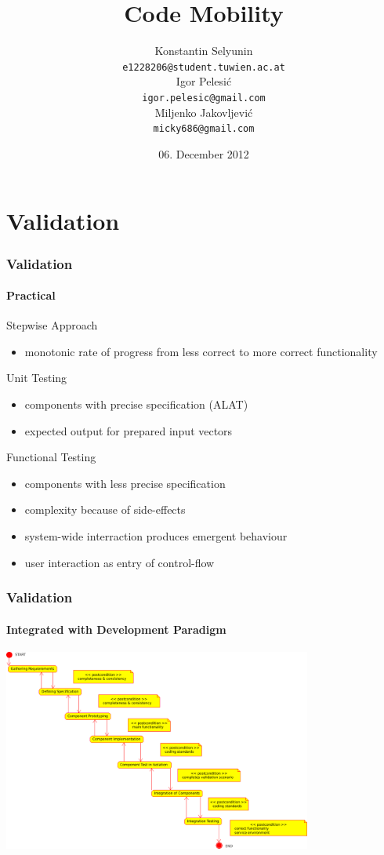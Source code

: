 \documentclass{beamer}
\title[Code Mobility]{Code Mobility}
\date{06. December 2012}
\author[Selyunin,Pelesi\'c,Jakovljevi\'c]{
 \Large{Konstantin Selyunin}\\
  \small{\texttt{e1228206@student.tuwien.ac.at}}\\
 \Large{Igor Pelesi\'c}\\
  \small{\texttt{igor.pelesic@gmail.com}}\\
 \Large{Miljenko Jakovljevi\'c}\\
  \small{\texttt{micky686@gmail.com}}\\
}
\theoremstyle{definition} \newtheorem{mdefinition}{Definition}
\theoremstyle{plain} \newtheorem{mtheorem}{Theorem}
\theoremstyle{plain} \newtheorem{mcorollary}{Corollary}
\theoremstyle{plain} \newtheorem{mfact}{Fact}
\begin{document}
\section{Validation}

\begin{frame}
  \frametitle{Validation}
  \framesubtitle{Practical}
  \begin{description}
  \item Stepwise Approach
    \begin{itemize}     
      \item monotonic rate of progress from less correct to more correct functionality 
    \end{itemize}
  \item Unit Testing 
    \begin{itemize}     
     \item components with precise specification (ALAT)
     \item expected output for prepared input vectors
    \end{itemize}
  \item Functional Testing
    \begin{itemize}     
     \item components with less precise specification
      \item complexity because of side-effects 
      \item system-wide interraction produces emergent behaviour
      \item user interaction as entry of control-flow 
    \end{itemize}
  \end{description}
\end{frame}

\begin{frame}
  \frametitle{Validation}
   \framesubtitle{Integrated with Development Paradigm}
  \includegraphics[width=4in]{img/stepwise_validation_process.png}
\end{frame}
\end{document}
